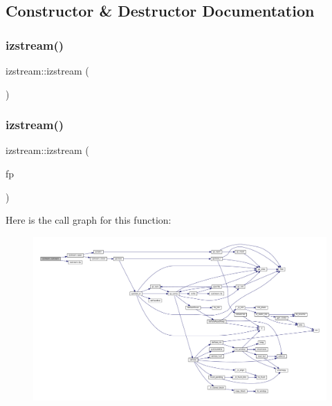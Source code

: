 \subsection{Constructor \& Destructor Documentation}
\mbox{\label{classizstream_a87441c80bae3b9237d66f586e396d996}} 
\subsubsection{\texorpdfstring{izstream()}{izstream()}\hspace{0.1cm}{\footnotesize\ttfamily [1/3]}}
{\footnotesize\ttfamily izstream\+::izstream (\begin{DoxyParamCaption}{ }\end{DoxyParamCaption})\hspace{0.3cm}{\ttfamily [inline]}}

\mbox{\label{classizstream_a9f958c2eef83729ec6dda0b800e48273}} 
\subsubsection{\texorpdfstring{izstream()}{izstream()}\hspace{0.1cm}{\footnotesize\ttfamily [2/3]}}
{\footnotesize\ttfamily izstream\+::izstream (\begin{DoxyParamCaption}\item[{F\+I\+LE $\ast$}]{fp }\end{DoxyParamCaption})\hspace{0.3cm}{\ttfamily [inline]}}

Here is the call graph for this function\+:
\nopagebreak
\begin{figure}[H]
\begin{center}
\leavevmode
\includegraphics[width=350pt]{classizstream_a9f958c2eef83729ec6dda0b800e48273_cgraph}
\end{center}
\end{figure}
\mbox{\label{classizstream_a30fb60b38cda7232e23b199c00e72412}} 
